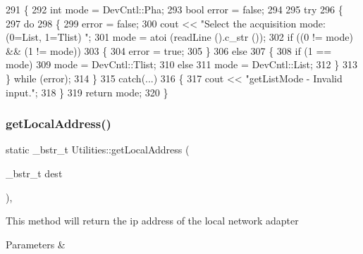 \begin{DoxyCode}
291     \{
292         \textcolor{keywordtype}{int} mode = DevCntl::Pha;
293         \textcolor{keywordtype}{bool} error = \textcolor{keyword}{false};
294         
295         \textcolor{keywordflow}{try} 
296         \{
297             \textcolor{keywordflow}{do} 
298             \{
299                 error = \textcolor{keyword}{false};
300                 cout << \textcolor{stringliteral}{"Select the acquisition mode: (0=List, 1=Tlist) "};
301                 mode = atoi (readLine ().c\_str ());
302                 \textcolor{keywordflow}{if} ((0 != mode) && (1 != mode))
303                 \{
304                     error = \textcolor{keyword}{true};
305                 \}
306                 \textcolor{keywordflow}{else} 
307                 \{
308                     \textcolor{keywordflow}{if} (1 == mode) 
309                         mode = DevCntl::Tlist;
310                     \textcolor{keywordflow}{else} 
311                         mode = DevCntl::List;
312                 \}
313             \} \textcolor{keywordflow}{while} (error);
314         \}
315         \textcolor{keywordflow}{catch}(...) 
316         \{
317             cout << \textcolor{stringliteral}{"getListMode - Invalid input."};
318         \}
319         \textcolor{keywordflow}{return} mode;
320     \}
\end{DoxyCode}
\mbox{\label{class_utilities_a02ce22f897bab42c413bbfb90c2022a2_a02ce22f897bab42c413bbfb90c2022a2}} 
\subsubsection{\texorpdfstring{get\+Local\+Address()}{getLocalAddress()}}
{\footnotesize\ttfamily static \+\_\+bstr\+\_\+t Utilities\+::get\+Local\+Address (\begin{DoxyParamCaption}\item[{\+\_\+bstr\+\_\+t}]{dest }\end{DoxyParamCaption})\hspace{0.3cm}{\ttfamily [inline]}, {\ttfamily [static]}}

This method will return the ip address of the local network adapter 
\begin{DoxyParams}{Parameters}
{\em } & \\
\hline
\end{DoxyParams}


